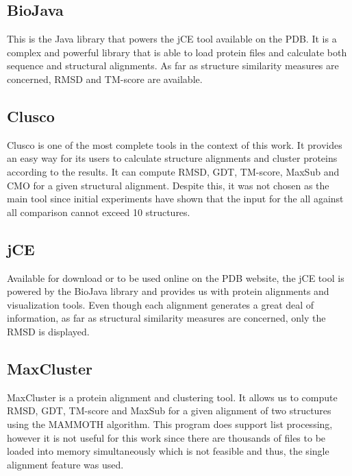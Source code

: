 \subsection{BioJava}

\cite{holland2008biojava}

This is the Java library that powers the jCE tool available on the PDB. It is a complex and powerful library that is able to load protein files and calculate both sequence and structural alignments. As far as structure similarity measures are concerned, RMSD and TM-score are available. 

\subsection{Clusco}

\cite{jamroz2013clusco}

Clusco is one of the most complete tools in the context of this work. It provides an easy way for its users to calculate structure alignments and cluster proteins according to the results. It can compute RMSD, GDT, TM-score, MaxSub and CMO for a given structural alignment. Despite this, it was not chosen as the main tool since initial experiments have shown that the input for the all against all comparison cannot exceed 10 structures.

\subsection{jCE}

\cite{prlic2010pre}

Available for download or to be used online on the PDB website, the jCE tool is powered by the BioJava library and provides us with protein alignments and visualization tools. Even though each alignment generates a great deal of information, as far as structural similarity measures are concerned, only the RMSD is displayed.

\subsection{MaxCluster}

MaxCluster is a protein alignment and clustering tool. It allows us to compute RMSD, GDT, TM-score and MaxSub for a given alignment of two structures using the MAMMOTH algorithm. This program does support list processing, however it is not useful for this work since there are thousands of files to be loaded into memory simultaneously which is not feasible and thus, the single alignment feature was used. \cite{herbert2008maxcluster}

